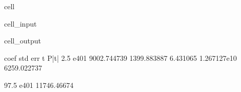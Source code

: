 \documentclass[letterpaper,10pt,english]{jupyterBook}
\begin{document}
\begin{sphinxuseclass}{cell}
\begin{sphinxVerbatimInput}
\begin{sphinxuseclass}{cell_input}
\end{sphinxuseclass}\end{sphinxVerbatimInput}
\begin{sphinxVerbatimOutput}

\begin{sphinxuseclass}{cell_output}
\begin{sphinxVerbatim}[commandchars=\\\{\}]
             coef      std err         t         P\PYGZgt{}|t|        2.5 \PYGZpc{}  \PYGZbs{}
e401  9002.744739  1399.883887  6.431065  1.267127e\PYGZhy{}10  6259.022737   

           97.5 \PYGZpc{}  
e401  11746.46674  
\end{sphinxVerbatim}

\end{sphinxuseclass}\end{sphinxVerbatimOutput}

\end{sphinxuseclass}
\end{document}
